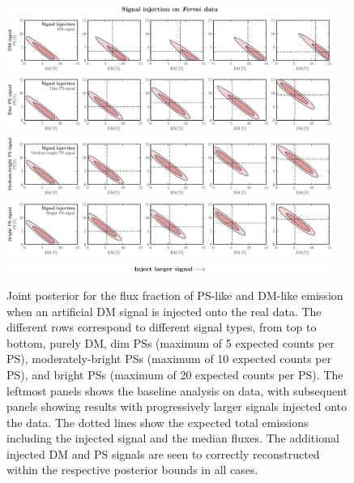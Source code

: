 \documentclass[prd,aps,10pt,nofootinbib,twocolumn,superscriptaddress,preprintnumbers,balancelastpage,longbibliography,floatfix]{revtex4-2}
\begin{document}
%
\begin{figure}[!htbp]
\centering
\includegraphics[width=0.95\textwidth]{plots/sig_inj_title.pdf}
\includegraphics[width=0.95\textwidth]{plots/data_sig_inj_dm.pdf}
\includegraphics[width=0.95\textwidth]{plots/data_sig_inj_dim_ps.pdf}
\includegraphics[width=0.95\textwidth]{plots/data_sig_inj_med_ps.pdf}
\includegraphics[width=0.95\textwidth]{plots/data_sig_inj_ps.pdf}
\includegraphics[width=0.95\textwidth]{plots/sig_inj_chyron.pdf}
\caption{Joint posterior for the flux fraction of PS-like and DM-like emission when an artificial DM signal is injected onto the real \Fermi data. The different rows correspond to different signal types, from top to bottom, purely DM, dim PSs (maximum of 5 expected counts per PS), moderately-bright PSs (maximum of 10 expected counts per PS), and bright PSs (maximum of 20 expected counts per PS). The leftmost panels shows the baseline analysis on \Fermi data, with subsequent panels showing results with progressively larger signals injected onto the data. The dotted lines show the expected total emissions including the injected signal and the median fluxes. The additional injected DM and PS signals are seen to correctly reconstructed within the respective posterior bounds in all cases.}
\label{fig:sig_inj_data}
\end{figure}
%
\end{document}
